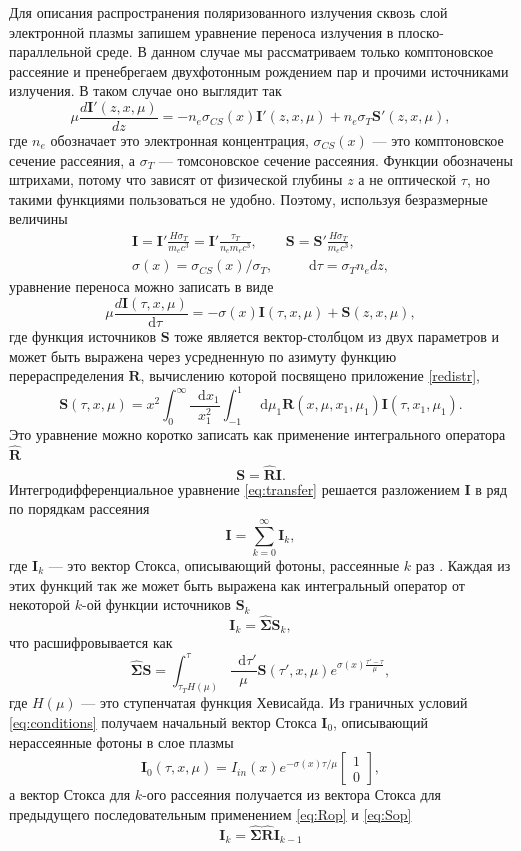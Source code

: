 \documentclass[14pt,a4paper]{extarticle}
\newcommand{\be}{\begin{equation}}
\newcommand{\ee}{\end{equation}}
\newcommand*\df {\mathop{}\!\mathrm{d}}
\begin{document}
			Для описания распространения поляризованного излучения сквозь слой электронной плазмы запишем уравнение переноса излучения в плоско-параллельной среде. 
			В данном случае мы рассматриваем только комптоновское рассеяние и пренебрегаем двухфотонным рождением пар и прочими источниками излучения.
			В таком случае оно выглядит так 
			\be
			\label{eq:transferprime}
			\mu \frac{d \bm I' (z,x,\mu)}{dz} = -  n_e\sigma_{CS}(x)\bm I'(z,x,\mu) + n_e\sigma_T\bm S'(z,x,\mu),
			\ee
			где
			$n_e$ обозначает это электронная концентрация,  
			$\sigma_{CS}(x)$ --- это комптоновское сечение рассеяния, а 
			$\sigma_T$ --- томсоновское сечение рассеяния. 
			Функции обозначены штрихами, потому что зависят от физической глубины $z$ а не оптической $\tau$, но такими функциями пользоваться не удобно.
			Поэтому, используя безразмерные величины \begin{align}
			\bm I=\bm I' \frac{H \sigma_T}{m_e c^3}=\bm I' \frac{\tau_T}{n_e m_e c^3}, \qquad \bm S=\bm S' \frac{H \sigma_T}{m_e c^3},\nonumber\\
			\sigma(x)=\sigma_{CS}(x)/\sigma_T, \qquad \df \tau= \sigma_T n_e dz, \end{align}
			уравнение переноса можно записать в виде  
			\be
			\label{eq:transfer}
			\mu \frac{d \bm I (\tau,x,\mu)}{\df \tau} = -  \sigma(x)\bm I(\tau,x,\mu) + \bm S(z,x,\mu),
			\ee
			где функция источников $\bm S$ тоже является вектор-столбцом из двух параметров и  
			может быть выражена через усредненную по азимуту функцию перераспределения $\bm{R}$, вычислению которой посвящено приложение \ref{redistr}, 
			\be
			\label{eq:Source}
			\bm S(\tau,x,\mu)= x^2 \int_0^\infty \frac{\df x_1}{x_1^2} \int_{-1}^1 \df \mu_1 
			\bm{R}(x,\mu,x_1,\mu_1)\bm{I}(\tau,x_1,\mu_1).
			\ee
			Это уравнение можно коротко записать как применение интегрального оператора $ \hat{\bm{R}}$
			\be
			\label{eq:Rop}
			\bm{S}=\hat{\bm{R}}\bm{I}.
			\ee
			Интегродифференциальное уравнение \eqref{eq:transfer} решается разложением $\bm{I}$ в ряд по порядкам рассеяния
			 \be
			 \bm{I}=\sum_{k=0}^\infty \bm{I}_k,
			\ee
			где $\bm{I}_k$ --- это вектор Стокса, описывающий фотоны, рассеянные $k$ раз \cite{Sunyaev1985}.
			Каждая из этих функций так же может быть выражена как интегральный оператор от некоторой $k$-ой функции источников $\bm{S}_k$
			\be
			\label{eq:Sop}
			 \bm{I}_k=\hat{\bm{\Sigma}}\bm{S}_k,
			\ee
			что расшифровывается как
			 \be
			 \hat{\bm{\Sigma}}\bm{S}=\int_{\tau_TH(\mu)}^\tau \frac{\df \tau'}{\mu} \bm{S}(\tau',x,\mu) e^{\sigma(x)\frac{\tau'-\tau}\mu},
			\ee 
			где $H(\mu)$ --- это ступенчатая функция Хевисайда. 
			Из граничных условий \eqref{eq:conditions} получаем начальный вектор Стокса $\bm{I}_0$, описывающий нерассеянные фотоны в слое плазмы
			\be
			\bm{I}_0(\tau,x,\mu)=I_{in}(x) e^{-\sigma(x)\tau/\mu}\begin{bmatrix}1\\0\end{bmatrix},
			\ee 
			а вектор Стокса для $k$-ого рассеяния получается из вектора Стокса для предыдущего последовательным применением \eqref{eq:Rop} и \eqref{eq:Sop}
			\be
			\bm{I}_k=\hat{\bm{\Sigma}}\hat{\bm{R}}\bm{I}_{k-1}
			\ee
\end{document}
